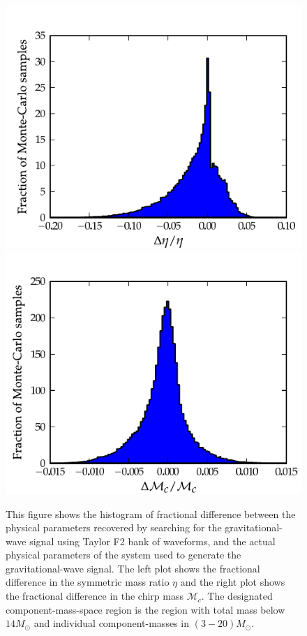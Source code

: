 \documentclass[aps,
prd,
amsmath,
amssymb,
twocolumn,
floatfix,
groupedaddress]{revtex4-1}
\begin{document}
\begin{figure}[]
\centerline{
\includegraphics[scale=0.04, clip=false,keepaspectratio=true, width=\columnwidth]{hist_eta_err14paramF2EOB.pdf}\label{fig:errparams_f2eob_eta}              
\includegraphics[scale=0.04, clip=false, keepaspectratio=true, width=\columnwidth]{hist_mchirp_err14paramF2EOB.pdf}\label{fig:errparams_f2eob_mchirp}
}
\caption{This figure shows the histogram of fractional difference between the physical parameters recovered by searching for the gravitational-wave signal using Taylor F2 bank of waveforms, and the actual physical parameters of the system used to generate the gravitational-wave signal. The left plot shows the fractional difference in the symmetric mass ratio $\eta$ and the right plot shows the fractional difference in the chirp mass $\mathcal{M}_c$. The designated component-mass-space region is the region with total mass below $14M_{\odot}$ and individual component-masses in $(3-20)M_{\odot}$.}
\end{figure}
\end{document}
